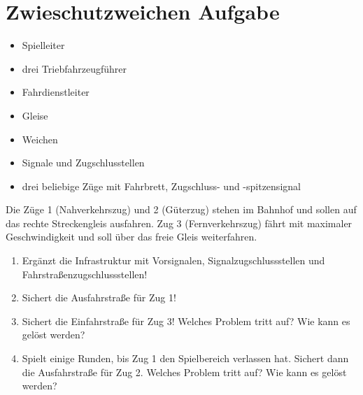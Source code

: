 

\section{Zwieschutzweichen Aufgabe}

  \roles
    \begin{itemize}
      \item Spielleiter
      \item drei Triebfahrzeugführer
      \item Fahrdienstleiter
    \end{itemize}

  \material
    \begin{itemize}
      \item Gleise
      \item Weichen
      \item Signale und Zugschlusstellen
      \item drei beliebige Züge mit Fahrbrett, Zugschluss- und -spitzensignal
    \end{itemize}

  \setup
    Die Züge 1 (Nahverkehrszug) und 2 (Güterzug) stehen im Bahnhof und sollen auf das rechte Streckengleis ausfahren. Zug 3 (Fernverkehrszug) fährt mit maximaler Geschwindigkeit und soll über das freie Gleis weiterfahren.

  \task
    \begin{enumerate}[label=\alph*)]
      \item Ergänzt die Infrastruktur mit Vorsignalen, Signalzugschlussstellen und Fahrstraßenzugschlussstellen!
      \item Sichert die Ausfahrstraße für Zug 1!
      \item Sichert die Einfahrstraße für Zug 3! Welches Problem tritt auf? Wie kann es gelöst werden?
      \item Spielt einige Runden, bis Zug 1 den Spielbereich verlassen hat. Sichert dann die Ausfahrstraße für Zug 2. Welches Problem tritt auf? Wie kann es gelöst werden?
    \end{enumerate}